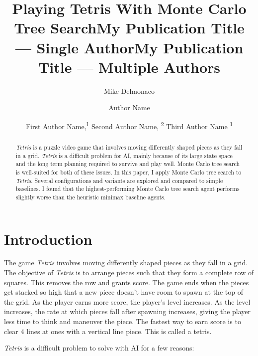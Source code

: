 \documentclass[letterpaper]{article} %
\title{Playing Tetris With Monte Carlo Tree Search}
\author{
    Mike Delmonaco
}
\title{My Publication Title --- Single Author}
\author {
    Author Name
}
\title{My Publication Title --- Multiple Authors}
\author {
    First Author Name,\textsuperscript{\rm 1}
    Second Author Name, \textsuperscript{\rm 2}
    Third Author Name \textsuperscript{\rm 1}
}
\begin{document}
\newcommand{\tetris}{\emph{Tetris}}

\maketitle

\begin{abstract}
  \tetris{} is a puzzle video game that involves moving differently shaped pieces as they fall in a grid.
  \tetris{} is a difficult problem for AI, mainly because of its large state space and the long term planning required to survive and play well.
  Monte Carlo tree search is well-suited for both of these issues. In this paper, I apply Monte Carlo tree search to \tetris. Several configurations and variants are explored and compared to simple baselines.
  I found that the highest-performing Monte Carlo tree search agent performs slightly worse than the heuristic minimax baseline agents.
\end{abstract}

\section{Introduction}
The game \tetris{} involves moving differently shaped pieces as they fall in a grid.
The objective of \tetris{} is to arrange pieces such that they form a complete row of squares. This removes the row and grants score. The game ends when the pieces get stacked so high that a new piece doesn't have room to spawn at the top of the grid.
As the player earns more score, the player's level increases. As the level increases, the rate at which pieces fall after spawning increases, giving the player less time to think and maneuver the piece.
The fastest way to earn score is to clear 4 lines at ones with a vertical line piece. This is called a tetris.

\tetris{} is a difficult problem to solve with AI for a few reasons:
\end{document}
